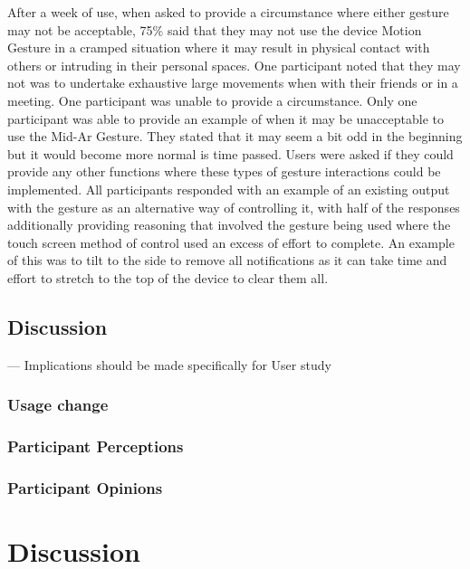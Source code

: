 \documentclass{l4proj}
\begin{document}
After a week of use, when asked to provide a circumstance where either gesture may not be acceptable, 75\% said that they may not use the device Motion Gesture in a cramped situation where it may result in physical contact with others or intruding in their personal spaces. One participant noted that they may not was to undertake exhaustive large movements when with their friends or in a meeting. One participant was unable to provide a circumstance. Only one participant was able to provide an example of when it may be unacceptable to use the Mid-Ar Gesture. They stated that it may seem a bit odd in the beginning but it would become more normal is time passed. Users were asked if they could provide any other functions where these types of gesture interactions could be implemented. All participants responded with an example of an existing output with the gesture as an alternative way of controlling it, with half of the responses additionally providing reasoning that involved the gesture being used where the touch screen method of control used an excess of effort to complete. An example of this was to tilt to the side to remove all notifications as it can take time and effort to stretch to the top of the device to clear them all.


\section{Discussion} 

--- Implications should be made specifically for User study

\subsection{Usage change}

\subsection{Participant Perceptions}

\subsection{Participant Opinions}


\chapter{Discussion} 
\end{document}
